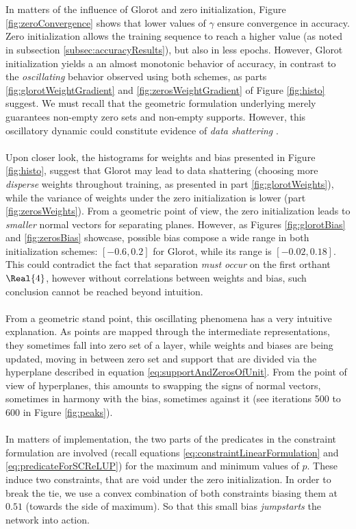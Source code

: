 \\\\
In matters of the influence of Glorot and zero initialization, Figure \ref{fig:zeroConvergence} shows that lower values of $\gamma$ ensure convergence in accuracy. Zero initialization allows the training sequence to reach a higher value (as noted in subsection \ref{subsec:accuracyResults}), but also in less epochs. However, Glorot initialization yields a an almost monotonic behavior of accuracy, in contrast to the \emph{oscillating} behavior observed using both schemes, as parts \ref{fig:glorotWeightGradient} and \ref{fig:zerosWeightGradient} of Figure \ref{fig:histo} suggest. We must recall that the geometric formulation underlying \SCReLU merely guarantees non-empty zero sets and non-empty supports. However, this oscillatory dynamic could constitute evidence of \emph{data shattering} \cite{Zhang2016RethinkingGeneralization}. 
\\\\
Upon closer look, the histograms for weights and bias presented in Figure \ref{fig:histo}, suggest that Glorot may lead to data shattering (choosing more \emph{disperse} weights throughout training, as presented in part \ref{fig:glorotWeights}), while the variance of weights under the zero initialization is lower (part \ref{fig:zerosWeights}). From a geometric point of view, the zero initialization leads to \emph{smaller} normal vectors for separating planes. However, as Figures \ref{fig:glorotBias} and \ref{fig:zerosBias} showcase, possible bias  compose a wide range in both initialization schemes: $[-0.6,0.2]$ for Glorot, while its range is $[-0.02,0.18]$. This could contradict the fact that separation \emph{must occur} on the first orthant $\Real{4}$, however without correlations between weights and bias, such conclusion cannot be reached beyond intuition.    
\\\\
From a geometric stand point, this oscillating phenomena has a very intuitive explanation. As points are mapped through the intermediate representations, they sometimes fall into zero set of a layer, while weights and biases are being updated, moving in between zero set and support that are divided via the hyperplane described in equation \ref{eq:supportAndZerosOfUnit}. From the point of view of hyperplanes, this amounts to swapping the signs of normal vectors, sometimes in harmony with the bias, sometimes against it (see iterations 500 to 600 in Figure \ref{fig:peaks}). 
\\\\
In matters of implementation, the two parts of the predicates in the constraint formulation are involved (recall equations \ref{eq:constraintLinearFormulation} and \ref{eq:predicateForSCReLUP}) for the maximum and minimum values of $p$. These induce two constraints, that are void under the zero initialization.  In order to break the tie, we use a convex combination of both constraints biasing them at $0.51$ (towards the side of maximum). So that this small bias \emph{jumpstarts} the network into action.  

